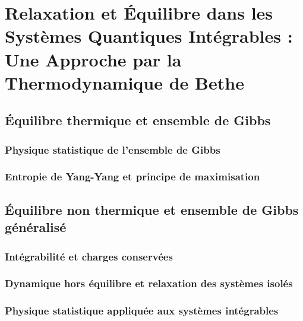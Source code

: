 \chapter{Relaxation et Équilibre dans les Systèmes Quantiques Intégrables : Une Approche par la Thermodynamique de Bethe}
\minitoc
\section{Équilibre thermique et ensemble de Gibbs}

%


%
\subsection{Physique statistique de l’ensemble de Gibbs}


\subsection{Entropie de Yang-Yang et principe de maximisation}

\section{Équilibre non thermique et ensemble de Gibbs généralisé}

\subsection{Intégrabilité et charges conservées}
\subsection{Dynamique hors équilibre et relaxation des systèmes isolés}
\subsection{Physique statistique appliquée aux systèmes intégrables}

